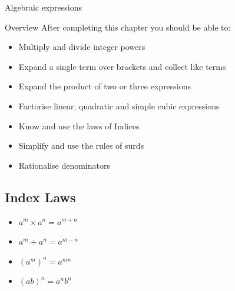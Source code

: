 \documentclass[fleqn, twoside]{article}
\newcommand{\bookletunittitle}{Algebraic expressions}               %
\begin{document}
\newpage
\pagestyle{branded}
\setcounter{page}{1}




\begin{minipage}[t]{.85\textwidth}
        \sffamily{}
        \bfseries\YUGE\raggedright\bookletunittitle\\
\end{minipage}
\begin{minipage}[t]{.15\textwidth}
        \sffamily
        \bfseries\YUGE\raggedleft{}
\end{minipage}

\begin{mybox2}[colbacktitle=green]{Overview}
    After completing this chapter you should be able to:
    \begin{itemize}
        \item Multiply and divide integer powers
        \item Expand a single term over brackets and collect like terms
        \item Expand the product of two or three expressions
        \item Factorise linear, quadratic and simple cubic expressions
        \item Know and use the laws of Indices
        \item Simplify and use the rules of surds
        \item Rationalise denominators
    \end{itemize}
\end{mybox2}




\subsection{Index Laws}
\begin{itemize}
    \item $a^m \times a^n = a^{m+n}$
    \item $a^m \div a^n = a^{m-n}$
    \item $(a^m)^n = a^{mn}$
    \item $(ab)^n = a^nb^n$
\end{itemize}
\end{document}
